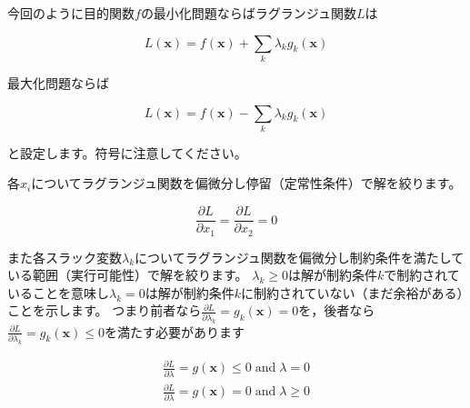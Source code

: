 \documentclass{jsarticle}
\begin{document}
今回のように目的関数$f$の最小化問題ならばラグランジュ関数$L$は

$$L(\bm{x})=f(\bm{x})+\sum_k \lambda_k g_k(\bm{x})$$

最大化問題ならば

$$L(\bm{x})=f(\bm{x})-\sum_k \lambda_k g_k(\bm{x})$$

と設定します。符号に注意してください。

各$x_i$についてラグランジュ関数を偏微分し停留（定常性条件）で解を絞ります。

$$\frac{\partial L}{\partial x_1}=\frac{\partial L}{\partial x_2}=0$$

また各スラック変数$\lambda_k$についてラグランジュ関数を偏微分し制約条件を満たしている範囲（実行可能性）で解を絞ります。
$\lambda_k\ge0$は解が制約条件$k$で制約されていることを意味し$\lambda_k=0$は解が制約条件$k$に制約されていない（まだ余裕がある）ことを示します。
つまり前者なら$\frac{\partial L}{\partial \lambda_k}=g_k(\bm{x})=0$を，後者なら$\frac{\partial L}{\partial \lambda_k}=g_k(\bm{x})\le0$を満たす必要があります

\begin{align*}
\frac{\partial L}{\partial \lambda} = g(\bm{x})\le0 \;\text{and}\;\lambda=0
\\
\frac{\partial L}{\partial \lambda} = g(\bm{x})=0 \;\text{and}\;\lambda\ge0
\end{align*}
\end{document}
